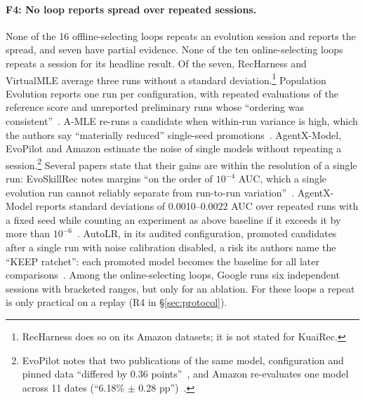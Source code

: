 \documentclass[sigconf,nonacm]{acmart}
\begin{document}
\paragraph{F4: No loop reports spread over repeated sessions.} None of the 16 offline-selecting
loops repeats an evolution session and reports the spread, and seven have partial evidence. None of the ten online-selecting loops repeats a session for its headline result. Of the seven, RecHarness and VirtualMLE
average three runs without a standard deviation.\footnote{RecHarness does so on its Amazon datasets; it is not stated for KuaiRec.} Population Evolution reports one run per configuration, with repeated
evaluations of the reference score and unreported preliminary runs whose ``ordering was consistent''~\cite{peng2026population}. A-MLE re-runs a candidate when within-run variance is high, which the authors say ``materially
reduced'' single-seed promotions~\cite{gao2026amle}. AgentX-Model, EvoPilot and Amazon estimate the noise of single
models without repeating a session.\footnote{EvoPilot notes that two publications of the same model, configuration and pinned
data ``differed by 0.36 points''~\cite{fu2026evopilot}, and Amazon re-evaluates one model across 11 dates (``6.18\%
$\pm$ 0.28 pp'')~\cite{chandran2026autoresearch}.} Several papers state that their gains are within the resolution of
a single run: EvoSkillRec notes margins ``on the order of $10^{-4}$ AUC, which a single evolution run cannot reliably
separate from run-to-run variation''~\cite{li2026evoskillrec}. AgentX-Model reports standard deviations of
0.0010--0.0022 AUC over repeated runs with a fixed seed while counting an experiment as above baseline if it exceeds it by more than
$10^{-6}$~\cite{yang2026agentxmodel}. AutoLR, in its audited configuration, promoted candidates after a single run
with noise calibration disabled, a risk its authors name the ``KEEP ratchet'': each promoted model becomes the
baseline for all later comparisons~\cite{zhang2026autolr}. Among the online-selecting loops, Google runs six independent sessions with bracketed ranges, but only for an ablation. For these loops a repeat
is only practical on a replay (R4 in \S\ref{sec:protocol}).
\end{document}
